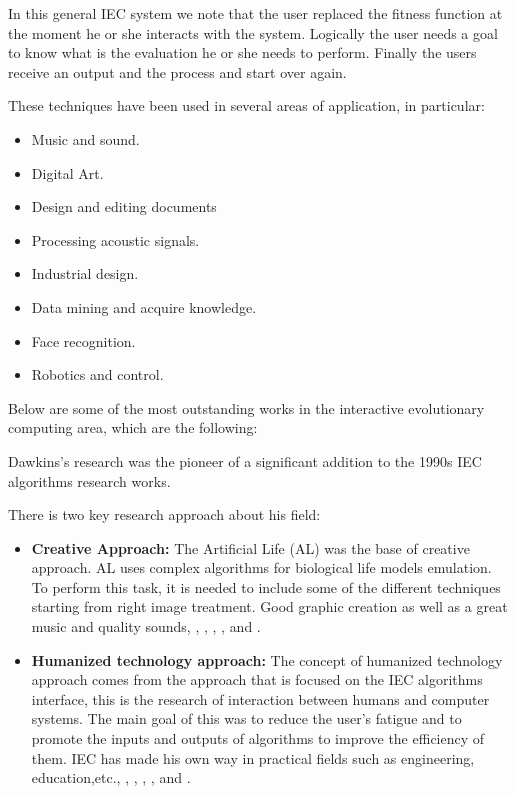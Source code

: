 In this general IEC system we note that the user replaced the fitness function at the moment he or she interacts with the system. Logically the user needs a goal to know what is the evaluation he or she needs to perform. Finally the users receive an output and the process and start over again.

These techniques have been used in several areas of application, in particular:
\begin{itemize}  
	\item Music and sound.
	\item Digital Art.
	\item Design and editing documents
	\item Processing acoustic signals.
	\item Industrial design.
	\item Data mining and acquire knowledge.
	\item Face recognition.
	\item Robotics and control.
\end{itemize}

Below are some of the most outstanding works in the interactive evolutionary computing area, which are the following:


Dawkins's research was the pioneer of a significant addition to the
1990s IEC algorithms research works\cite{dawkins1986blind}.

There is two key research approach about his field:

\begin{itemize}
	\item \textbf{Creative Approach:} The Artificial Life (AL) was the base of creative approach.
	AL uses complex algorithms for biological life models emulation. To perform this
	task, it is needed to include some of the different techniques starting from
	right image treatment. Good graphic creation as well as a great music and
	quality sounds, \cite{sims1991artificial}, \cite{sims1994evolving},
	\cite{dawkins1986blind}, \cite{disz1997ubiworld},
	\cite{unemi2000sbart}and \cite{unemi2003sbeat3}.
	\item \textbf{Humanized technology approach:} The concept of humanized technology approach
	comes from the approach that is focused on the IEC algorithms interface, this is
	the research of interaction between humans and computer systems. The main goal
	of this was to reduce the user's fatigue and to promote the inputs and outputs
	of algorithms to improve the efficiency of them. IEC has made his own way in
	practical fields such as engineering, education,etc.,
	\cite{parmee1993concrete}, \cite{ventrella1994explorations},
	\cite{takagi1996discrete}, \cite{poli1997genetic},
	\cite{parmee1998genetic} and \cite{takagi1998interactive}.
\end{itemize}

